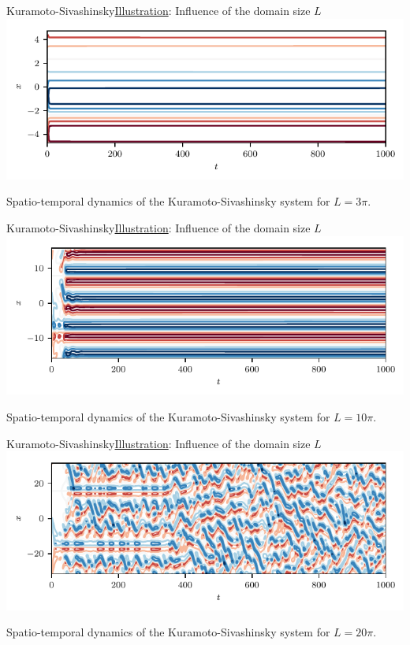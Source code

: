\documentclass[usenames,dvipsnames,svgnames,10pt,aspectratio=169]{beamer}
\begin{document}
\begin{frame}[t, c]{Kuramoto-Sivashinsky}{\underline{Illustration}: Influence of the domain size $L$}
	\centering
	\includegraphics[width=.75\textwidth]{kuramoto_sivashinsky_small_domain}

	Spatio-temporal dynamics of the Kuramoto-Sivashinsky system for $L = 3 \pi$.

	\vspace{1cm}
\end{frame}

\begin{frame}[t, c]{Kuramoto-Sivashinsky}{\underline{Illustration}: Influence of the domain size $L$}
	\centering
	\includegraphics[width=.75\textwidth]{kuramoto_sivashinsky_medium_domain}

	Spatio-temporal dynamics of the Kuramoto-Sivashinsky system for $L = 10 \pi$.

	\vspace{1cm}
\end{frame}

\begin{frame}[t, c]{Kuramoto-Sivashinsky}{\underline{Illustration}: Influence of the domain size $L$}
	\centering
	\includegraphics[width=.75\textwidth]{kuramoto_sivashinsky_medium_large_domain}

	Spatio-temporal dynamics of the Kuramoto-Sivashinsky system for $L = 20 \pi$.

	\vspace{1cm}
\end{frame}
\end{document}
